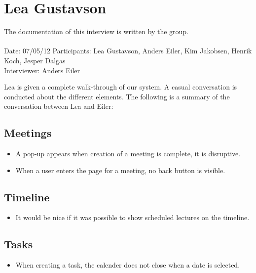 
\section{Lea Gustavson}
The documentation of this interview is written by the \timelinegroup{} group. \\ \ \\
Date: 07/05/12
Participants: Lea Gustavson, Anders Eiler, Kim Jakobsen, Henrik Koch, Jesper Dalgas \\
Interviewer: Anders Eiler

Lea is given a complete walk-through of our system.
A casual conversation is conducted about the different elements.
The following is a summary of the conversation between Lea and Eiler:

\subsection*{Meetings}
\begin{itemize}
	\item A pop-up appears when creation of a meeting is complete, it is disruptive.
	\item When a user enters the page for a meeting, no back button is visible.
\end{itemize}


\subsection*{Timeline}
\begin{itemize}
	\item It would be nice if it was possible to show scheduled lectures on the timeline.
\end{itemize}


\subsection*{Tasks}
\begin{itemize}
	\item When creating a task, the calender does not close when a date is selected.
\end{itemize}


